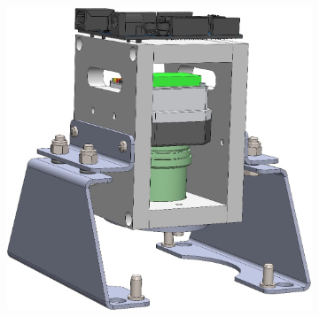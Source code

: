 \begin{figure}[H]
    \begin{subfigure}[b]{0.49\textwidth}
        \centering
        \includegraphics[width=\textwidth]{../figs/data/camera_jig_design.jpeg}
        \label{fig:design}
    \end{subfigure}
    \hfill
    \begin{subfigure}[b]{0.49\textwidth}
        \centering

\end{subfigure}
\end{figure}
